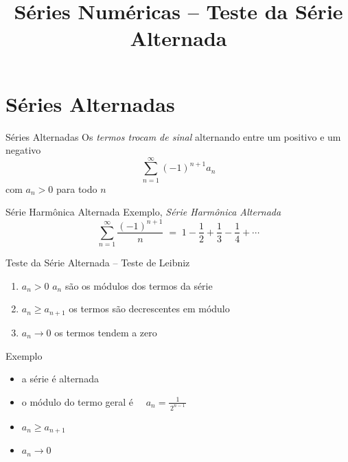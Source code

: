 \documentclass[fleqn,utf8,aspectratio=169,12pt]{beamer}
\title {Séries Numéricas -- Teste da Série Alternada}
\begin{document}
\addtitle

\section{Séries Alternadas}

\begin{frame}{Séries Alternadas}
  Os \emph{termos trocam de sinal}
  \pause
  alternando entre um positivo e um negativo
  \pause
  \[
    \sum_{n=1}^\infty (-1)^{n+1} a_n
  \]
  com $a_n >0$ para todo $n$
\end{frame}

\begin{frame}{Série Harmônica Alternada}
  Exemplo, \emph{Série Harmônica Alternada}
  \[
    \sum_{n=1}^\infty \frac{(-1)^{n+1}}{n}
    \;=\; 1 - \frac{1}{2} + \frac{1}{3} - \frac{1}{4} + \cdots
  \]
\end{frame}

\begin{frame}{Teste da Série Alternada -- Teste de Leibniz}

  \vspace{0.5\baselineskip}
  \begin{enumerate}[<+->]
      \item $a_n>0$           \tabto{30mm} $a_n$ são os módulos dos termos da série  \\[2mm]
      \item $a_n\geq a_{n+1}$ \tabto{30mm} os termos são decrescentes em módulo      \\[2mm]
      \item $a_n\to 0$        \tabto{30mm} os termos tendem a zero
  \end{enumerate}

\end{frame}

\addtocounter{exemplo}{1}
\begin{frame}{Exemplo \theexemplo}
  \begin{itemize}[<+->]
    \item a série é alternada
    \item o módulo do termo geral é \(\quad a_n = \frac{1}{\,2^{n-1}\,} \)
    \item $a_n\geq a_{n+1}$
    \item $a_n\to 0$
  \end{itemize}
\end{frame}
\end{document}

